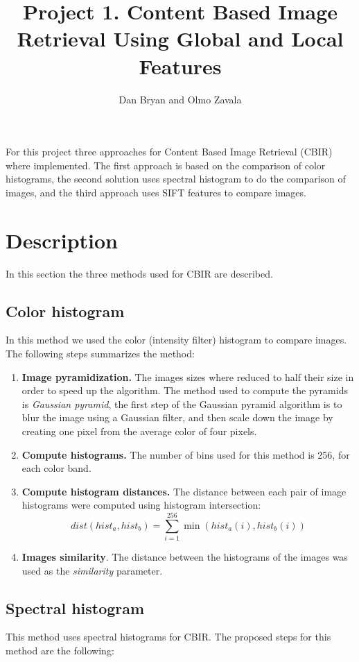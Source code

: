 \documentclass[a4paper,12pt]{article}
\title{Project 1. Content Based Image Retrieval Using Global and Local Features}
\author{Dan Bryan and Olmo Zavala}
\begin{document}
\maketitle

For this project three approaches for Content Based Image Retrieval  (CBIR)
where implemented. The first approach is based on the comparison of color 
histograms, the second solution uses spectral histogram to do the comparison
of images, and the third approach uses SIFT features to compare images. 

\section{Description}
In this section the three methods used for CBIR are described. 

\subsection{Color histogram}
\label{sec_colorhist}
In this method we used the color (intensity filter) histogram  to 
compare images. The following steps summarizes the method:
\begin{enumerate}
    \item \textbf{Image pyramidization. } The images sizes where reduced
        to half their size in order to speed up the algorithm. The method used
        to compute the pyramids is \emph{Gaussian pyramid}, the first
        step of the Gaussian pyramid algorithm is to blur the image 
        using a Gaussian filter, and then scale down the image by 
        creating one pixel from the average color of four pixels.
    \item \textbf{Compute histograms.} The number of bins used
        for this method is 256, for each color band.
    \item \textbf{Compute histogram distances.} The distance between
        each pair of image histograms were computed using histogram intersection:
        \begin{equation}
            dist(hist_a,hist_b) = \sum_{i=1}^{256} \min( hist_a(i), hist_b(i))
        \end{equation}
    \item \textbf{Images similarity}. The distance between the histograms
        of the images was used as the \emph{similarity} parameter. 
\end{enumerate}

\subsection{Spectral histogram}
\label{sec_spechist}
This method uses spectral histograms for CBIR. The proposed steps
for this method are the following:
\end{document}
